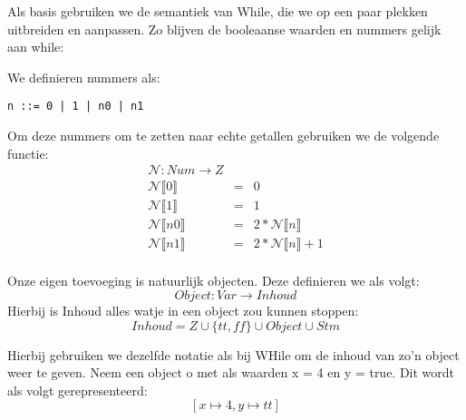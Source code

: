 \documentclass[12pt]{article}
\begin{document}
Als basis gebruiken we de semantiek van While, die we op een paar plekken uitbreiden en aanpassen.
Zo blijven de booleaanse waarden en nummers gelijk aan while:

We definieren nummers als:
\begin{lstlisting}
n ::= 0 | 1 | n0 | n1
\end{lstlisting}

Om deze nummers om te zetten naar echte getallen gebruiken we de volgende functie:
$$
\begin{matrix}
\mathcal{N}: Num \rightarrow Z \\
\mathcal{N}\llbracket 0 \rrbracket &= &0  \\
\mathcal{N}\llbracket 1 \rrbracket &= &1 \\
\mathcal{N}\llbracket n0 \rrbracket &= &2 * \mathcal{N}\llbracket n \rrbracket \\
\mathcal{N}\llbracket n1 \rrbracket &= &2 * \mathcal{N}\llbracket n \rrbracket + 1 \\
\end{matrix}
$$

Onze eigen toevoeging is natuurlijk objecten. Deze definieren we als volgt:
$$Object : Var \rightarrow Inhoud$$ 
Hierbij is Inhoud alles watje in een object zou kunnen stoppen: 
$$Inhoud = Z \cup \{tt,ff\} \cup Object \cup Stm$$ 

Hierbij gebruiken we dezelfde notatie als bij WHile om de inhoud van zo'n object weer te geven.
Neem een object o met als waarden x = 4 en y = true. Dit wordt als volgt gerepresenteerd:
$$[x \mapsto 4, y \mapsto tt]$$
\end{document}
